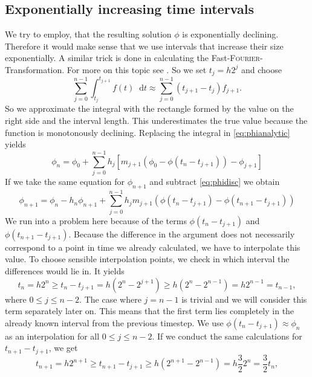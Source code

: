 \documentclass[12pt,a4paper,twoside, open=right]{scrreprt}
\theoremstyle{definition}
\theoremstyle{plain}
\newcommand{\D}{\mathop{}\!\mathrm{d}}
\begin{document}
\subsection{Exponentially increasing time intervals}
We try to employ, that the resulting solution $\phi$ is exponentially declining. Therefore it would make sense that we use intervals that increase their size exponentially. A similar trick is done in calculating the Fast-\textsc{Fourier}-Transformation. For more on this topic see \cite{Cooley1965}. So we set $t_j=h2^j$ and choose 
\begin{equation}
    \sum_{j=0}^{n-1}\int_{t_j}^{t_{j+1}}f(t)\D t\approx\sum_{j=0}^{n-1}(t_{j+1}-t_j)f_{j+1}.
\end{equation}
So we approximate the integral with the rectangle formed by the value on the right side and the interval length. This underestimates the true value because the function is monotonously declining. Replacing the integral in \eqref{eq:phianalytic} yields
\begin{equation}
    \phi_n = \phi_0 + \sum_{j=0}^{n-1}h_j[m_{j+1}(\phi_0-\phi(t_n-t_{j+1}))-\phi_{j+1}]\label{eq:phidisc}
\end{equation} 
If we take the same equation for $\phi_{n+1}$ and subtract \eqref{eq:phidisc} we obtain
\begin{equation}
    \phi_{n+1}= \phi_n -h_n\phi_{n+1}+\sum_{j=0}^{n-1}h_jm_{j+1}(\phi(t_n-t_{j+1})-\phi(t_{n+1}-t_{j+1}))\label{eq:phidiff}
\end{equation}
We run into a problem here because of the terms $\phi(t_n-t_{j+1})$ and $\phi(t_{n+1}-t_{j+1})$. Because the difference in the argument does not necessarily correspond to a point in time we already calculated, we have to interpolate this value. To choose sensible interpolation points, we check in which interval the differences would lie in. It yields
\begin{equation}
    t_n =h2^n\ge t_n-t_{j+1}=h(2^n-2^{j+1})\ge h(2^n-2^{n-1}) =h2^{n-1}=t_{n-1},
\end{equation}
where $0\le j\le n-2$. The case where $j=n-1$ is trivial and we will consider this term separately later on.
This means that the first term lies completely in the already known interval from the previous timestep. We use $\phi(t_n-t_{j+1})\approx\phi_n$ as an interpolation for all $0\le j\le n-2$. If we conduct the same calculations for $t_{n+1}-t_{j+1}$, we get
\begin{equation}
    t_{n+1}=h2^{n+1}\ge t_{n+1}-t_{j+1}\ge h(2^{n+1}-2^{n-1})=h\frac{3}{2}2^n=\frac{3}{2}t_n,
\end{equation}
\end{document}
